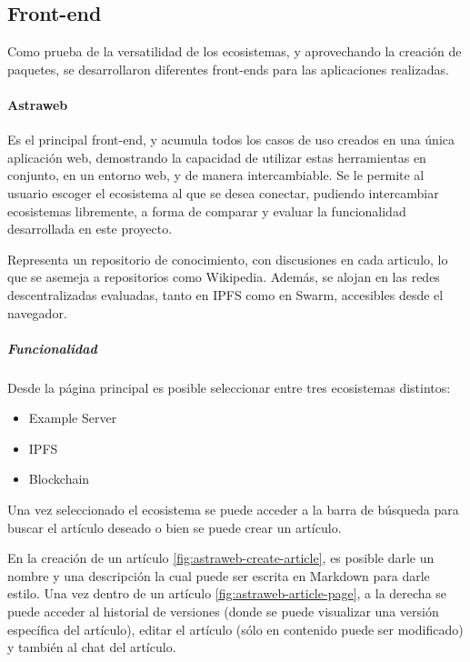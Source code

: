 \subsection{Front-end}


Como prueba de la versatilidad de los ecosistemas, y aprovechando la creación de paquetes, se desarrollaron diferentes front-ends para las aplicaciones realizadas.

\paragraph{Astraweb}

Es el principal front-end, y acumula todos los casos de uso creados en una única aplicación web, demostrando la capacidad de utilizar estas herramientas en conjunto, en un entorno web, y de manera intercambiable. Se le permite al usuario escoger el ecosistema al que se desea conectar, pudiendo intercambiar ecosistemas libremente, a forma de comparar y evaluar la funcionalidad desarrollada en este proyecto.

Representa un repositorio de conocimiento, con discusiones en cada articulo, lo que se asemeja a repositorios como Wikipedia. Además, se alojan en las redes descentralizadas evaluadas, tanto en IPFS como en Swarm, accesibles desde el navegador.

\subparagraph{Funcionalidad}

Desde la página principal es posible seleccionar entre tres ecosistemas distintos:

\begin{itemize}
    \item Example Server
    \item IPFS
    \item Blockchain
\end{itemize}

Una vez seleccionado el ecosistema se puede acceder a la barra de búsqueda para buscar el artículo deseado o bien se puede crear un artículo.

En la creación de un artículo \ref{fig:astraweb-create-article}, es posible darle un nombre y una descripción la cual puede ser escrita en Markdown para darle estilo. Una vez dentro de un artículo \ref{fig:astraweb-article-page}, a la derecha se puede acceder al historial de versiones (donde se puede visualizar una versión específica del artículo), editar el artículo (sólo en contenido puede ser modificado) y también al chat del artículo.

